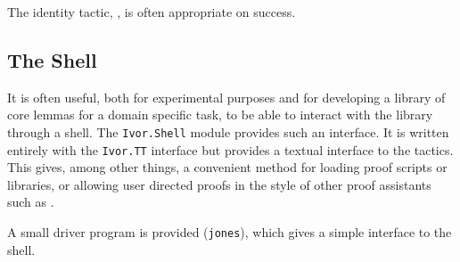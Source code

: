 The identity tactic, , is often appropriate on success.

\subsection{The Shell}

It is often useful, both for experimental purposes and for developing
a library of core lemmas for a domain specific task, to be able to
interact with the library through a shell. The \texttt{Ivor.Shell}
module provides such an interface. It is written entirely with the
\texttt{Ivor.TT} interface but provides a textual interface to the
tactics. This gives, among other things, a convenient method for
loading proof scripts or libraries, or allowing user directed proofs
in the style of other proof assistants such as \Coq{}.

A small driver program is provided (\texttt{jones}), which gives a
simple interface to the \Ivor{} shell.
